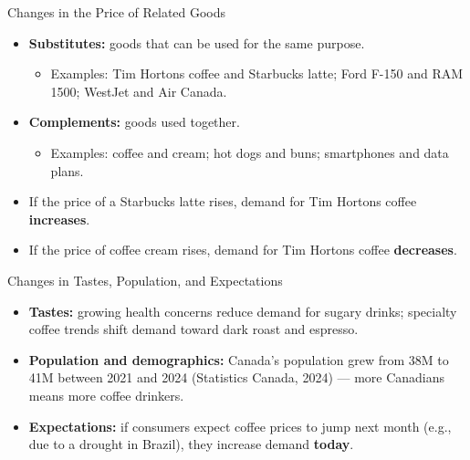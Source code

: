\documentclass[aspectratio=169]{beamer}
\begin{document}
\begin{frame}{Changes in the Price of Related Goods}
\transfade
\begin{itemize}
  \item \textbf{Substitutes:} goods that can be used for the same purpose.
  \begin{itemize}
    \item Examples: Tim Hortons coffee and Starbucks latte; Ford F-150 and RAM 1500; WestJet and Air Canada.
  \end{itemize}
  \item \textbf{Complements:} goods used together.
  \begin{itemize}
    \item Examples: coffee and cream; hot dogs and buns; smartphones and data plans.
  \end{itemize}
  \item If the price of a Starbucks latte rises, demand for Tim Hortons coffee \textbf{increases}.
  \item If the price of coffee cream rises, demand for Tim Hortons coffee \textbf{decreases}.
\end{itemize}
\end{frame}

\begin{frame}{Changes in Tastes, Population, and Expectations}
\transfade
\begin{itemize}
  \item \textbf{Tastes:} growing health concerns reduce demand for sugary drinks; specialty coffee trends shift demand toward dark roast and espresso.
  \item \textbf{Population and demographics:} Canada's population grew from 38M to 41M between 2021 and 2024 (Statistics Canada, 2024) --- more Canadians means more coffee drinkers.
  \item \textbf{Expectations:} if consumers expect coffee prices to jump next month (e.g., due to a drought in Brazil), they increase demand \textbf{today}.
\end{itemize}
\end{frame}
\end{document}
